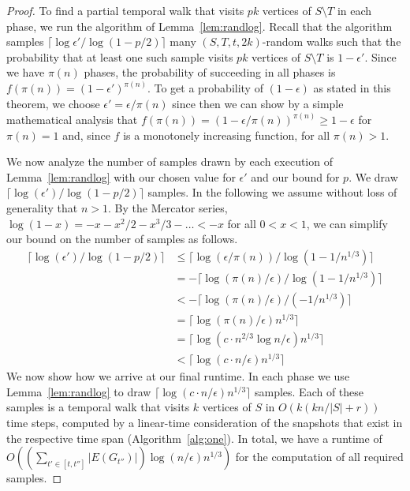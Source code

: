 \documentclass[10pt,a4paper]{article}
\begin{document}
{\begin{proof}
    To find a partial temporal walk that visits $pk$ vertices {of $S\setminus T$} in each phase, we
    run the algorithm of Lemma~\ref{lem:randlog}. Recall that the algorithm
    samples {$\lceil \log \epsilon'/\log(1-p/2) \rceil$ many $(S, T, t, 2k)$-random
    walks} such that the
    probability that at least one such sample visits $pk$ vertices of $S\setminus T$ is $1 -
    \epsilon'$. Since we have $\pi(n)$ phases, {the probability of succeeding 
    in all}
    phases is $f(\pi(n))=(1-\epsilon')^{\pi(n)}$. 
    To get a probability of {$(1-\epsilon)$ as stated in this theorem}, we 
    choose
    $\epsilon'=\epsilon/\pi(n)$ since then we can show by a simple mathematical
    analysis that 
    $f(\pi(n))=(1-\epsilon/\pi(n))^{\pi(n)} \geq 1-\epsilon$ for $\pi(n)
    = 1$ and, since $f$ is a monotonely increasing function, for all $\pi(n) >
    1$.


    We now analyze the number of samples drawn by each execution of
    Lemma~\ref{lem:randlog} with our chosen value for $\epsilon'$ and our bound
    for $p$. We {draw $\lceil \log (\epsilon')/\log(1-p/2) \rceil$} %
    samples.
    {In the following we assume without loss of generality that $n>1$}. By the Mercator series, $\log (1-x) = -x -x^2/2 -x^3/3 - \ldots< -x$ for all 
    $0<x<1$, we can simplify our bound on the number of samples as follows. 
    \begin{align*}
         \lceil \log (\epsilon')/\log({1-p/2}) \rceil &\leq \lceil \log (\epsilon/\pi(n))/\log(1-1/n^{1/3})\rceil\\
                                              &= - \lceil \log (\pi(n)/\epsilon)/\log(1-1/n^{1/3})\rceil\\
                                                 &< - \lceil \log (\pi(n)/\epsilon)/(-1/n^{1/3})\rceil\\
                                                 &=  \lceil \log (\pi(n)/\epsilon)n^{1/3} \rceil\\
                                                 &=  \lceil \log (c \cdot n^{2/3} \log n/\epsilon) n^{1/3} \rceil\\
                                                 &{< \lceil \log (c \cdot n/\epsilon) n^{1/3} \rceil}
    \end{align*}
    We now show how we arrive at our final runtime. In each phase we use
    Lemma~\ref{lem:randlog} to draw {$\lceil \log (c \cdot n/\epsilon) n^{1/3} \rceil$} samples. Each of
    these samples is a temporal walk that visits $k$ vertices of $S$ in $O(k(k
    n/|S|+r))$ time steps, computed by a linear-time {consideration} of the snapshots that
    exist in the respective time span {(Algorithm~\ref{alg:one})}. In total, we have a runtime of
    $O((\sum_{t' \in [t, t'']} |E(G_{t''})|) \log(n/\epsilon) n^{1/3})$ for the
    computation of all required samples. 
\end{proof}


}
\end{document}
